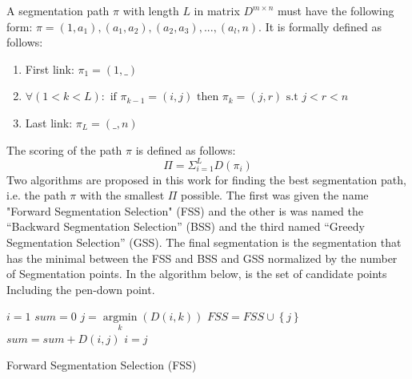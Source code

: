 \documentclass[journal,compsoc]{IEEEtran}
\begin{document}
A segmentation path $\pi$ with length $L$ in matrix $D^{m\times n}$ must have the following form: $\pi=(1,a_{1}),(a_{1},a_{2}),(a_{2},a_{3}),...,(a_{l},n)$.
It is formally defined as follows:
\begin{enumerate}
\item First link: $\pi_{1}=(1,\_)$
\item $ \forall (1<k<L): \mbox{ if } \pi_{k-1}=(i,j) \mbox{ then } \pi_{k}=(j,r) \mbox{ s.t } j<r<n$
\item Last link: $\pi_{L}=(\_,n)$
\end{enumerate}
The scoring of the path $\pi$ is defined as follows:
\begin{equation}
\Pi = \Sigma_{i=1}^{L}{D(\pi_{i})}
\end{equation}
Two algorithms are proposed in this work for finding the best segmentation path, i.e. the path $\pi$ with the smallest $\Pi$ possible. The first was given the name "Forward Segmentation Selection" (FSS) and the other is was named the “Backward Segmentation Selection” (BSS) and the third named “Greedy Segmentation Selection” (GSS). The final segmentation is the segmentation that has the minimal between the FSS and BSS and GSS normalized by the number of Segmentation points. In the algorithm below, is the set of candidate points Including the pen-down point.  


\begin{algorithm}
$i=1$\;
$sum=0$\;
{
	$j = \mathop {\arg \min }\limits_k \left( {D\left( {i,k} \right)} \right)$\;
	$FSS = FSS \cup \left\{ j \right\}$\;
	$sum = sum + D\left( {i,j} \right)$\;
	$i=j$\;
}
\caption{Forward Segmentation Selection (FSS)}
\label{alg:fss}
\end{algorithm}


\end{document}
